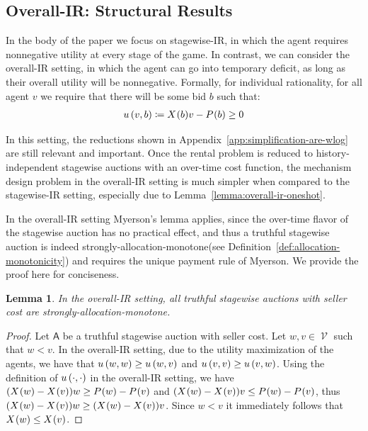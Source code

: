 \documentclass[11pt,letterpaper]{article}
\newcommand{\swir}{stagewise-IR\xspace}
\newcommand{\oir}{overall-IR\xspace}
\newcommand{\Oir}{Overall-IR\xspace}
\newcommand{\samono}{strongly-allocation-monotone\xspace}
\DeclareMathOperator*{\E}{\bb{E}}
\newcommand{\bb}[1]{\mathbb{#1}}
\DeclareMathOperator{\A}{\auc{A}}
\DeclareMathOperator{\V}{\mathcal{V}}
\theoremstyle{plain}
\newtheorem{lemma}[theorem]{Lemma}
\newcommand{\auc}[1]{\mathsf{#1}}
\begin{document}
\subsection{\Oir: Structural Results}\label{appendix:oir}

In the body of the paper we focus on \swir, in which the agent requires nonnegative utility at every stage of the game. In contrast, we can consider the \oir setting, in which the agent can go into temporary deficit, as long as their overall utility will be nonnegative. Formally, for individual rationality, for all agent $v$ we require that there will be some bid $b$ such that:
\begin{align*}
     \util{v}{b}\coloneq\utilformula{v}{b}\geq0
\end{align*}

In this setting, the reductions shown in Appendix~\ref{app:simplification-are-wlog} are still relevant and important. Once the rental problem is reduced to history-independent stagewise auctions with an over-time cost function, the mechanism design problem in the \oir setting is much simpler when compared to the \swir setting, especially due to Lemma~\ref{lemma:overall-ir-oneshot}.

In the \oir setting Myerson's lemma applies, since the over-time flavor of the stagewise auction has no practical effect, and thus a truthful stagewise auction is indeed \samono (see Definition~\ref{def:allocation-monotonicity}) and requires the unique payment rule of Myerson. We provide the proof here for conciseness. 

\begin{lemma}\label{lemma:oir-alloc-mono}
    In the \oir setting, all truthful stagewise auctions with seller cost are \samono.
\end{lemma}
\begin{proof}
    Let $\auc{A}$ be a truthful stagewise auction with seller cost. Let $w,v\in \V$ such that $w<v$. In the \oir setting, due to the utility maximization of the agents, we have that $\util{w}{w}\geq \util{w}{v}$ and $\util{v}{v}\geq \util{v}{w}$. Using the definition of $ \util{\cdot}{\cdot}$ in the \oir setting, we have $(\x{w}-\x{v})w\geq\p{w}-\p{v}$ and $(\x{w}-\x{v})v\leq\p{w}-\p{v}$, thus $(\x{w}-\x{v})w\geq (\x{w}-\x{v})v$. Since  $w<v$ it immediately follows that $\x{w}\leq \x{v}$.
\end{proof}
\end{document}
